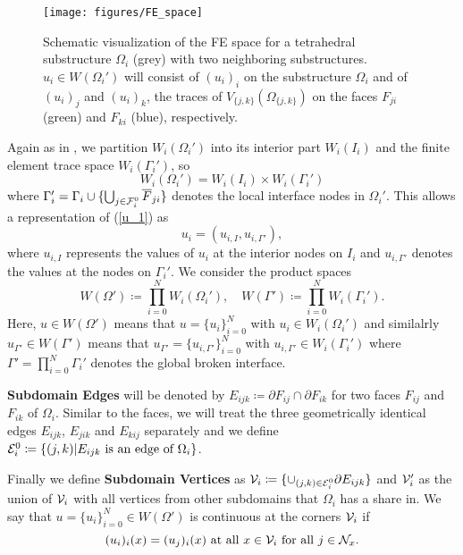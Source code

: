 \begin{figure}
    \centering
    \texttt{[image: figures/FE\_space]}
    \caption{Schematic visualization of the FE space for a tetrahedral substructure $\Omega_i$ (grey) with two neighboring substructures. $u_i \in W(\Omega_i')$ will consist of $(u_i)_i$ on the substructure $\Omega_i$ and of $(u_i)_j$ and $(u_i)_k$, the traces of $V_{\{j, k\}}(\Omega_{\{j, k\}})$ on the faces $F_{ji}$ (green) and $F_{ki}$ (blue), respectively.}
    \label{fig:fe-space}
\end{figure}

Again as in \cite{2D-proof}, we partition $W_i(\Omega_i')$ into its interior part $W_i(I_i)$ and the finite element trace space $W_i(\Gamma_i')$, so
\[W_i(\Omega_i') = W_i(I_i) \times W_i(\Gamma_i')\]
where $\Gamma_i' = \Gamma_i \cup \{\bigcup_{j \in \mathcal{F}_i^0} \overline{F}_{ji}\}$ denotes the local interface nodes in $\Omega_i'$. This allows a representation of (\ref{u_1}) as
\begin{equation}
    u_i = (u_{i,I}, u_{i,\Gamma'}),
\end{equation}
where $u_{i,I}$ represents the values of $u_i$ at the interior nodes on $I_i$ and $u_{i, \Gamma'}$ denotes the values at the nodes on $\Gamma_i'$. We consider the product spaces
\[W(\Omega') \coloneqq \prod_{i = 0}^N W_i(\Omega_i'), \quad W(\Gamma') \coloneqq \prod_{i = 0}^N W_i(\Gamma_i').\]
Here, $u \in W(\Omega')$ means that $u = \{u_i\}_{i = 0}^N$ with $u_i \in W_i(\Omega_i')$ and similalrly $u_{\Gamma'} \in W(\Gamma')$ means that $u_{\Gamma'} = \{u_{i, \Gamma'}\}_{i = 0}^N$ with $u_{i, \Gamma'} \in W_i(\Gamma_i')$ where $\Gamma' = \prod_{i = 0}^N \Gamma_i'$ denotes the global broken interface.

\textbf{Subdomain Edges} will be denoted by $E_{ijk} \coloneqq \partial F_{ij} \cap \partial F_{ik}$ for two faces $F_{ij}$ and $F_{ik}$ of $\Omega_i$. Similar to the faces, we will treat the three geometrically identical edges $E_{ijk}$, $E_{jik}$ and $E_{kij}$ separately and we define $\mathcal{E}_i^0 \coloneqq \{(j, k)|E_{ijk} \text{ is an edge of } \Omega_i\}$.

Finally we define \textbf{Subdomain Vertices} as $\mathcal{V}_i \coloneqq \{\cup_{(j,k) \in \mathcal{E}_i^0} \partial E_{ijk}\}$ and $\mathcal{V}_i'$ as the union of $\mathcal{V}_i$ with all vertices from other subdomains that $\Omega_i$ has a share in. We say that $u = \{u_i\}_{i = 0}^N \in W(\Omega')$ is continuous at the corners $\mathcal{V}_i$ if
\[(u_i)_i(x) = (u_j)_i(x) \text{ at all } x \in \mathcal{V}_i \text{ for all } j \in \mathcal{N}_x.\]


